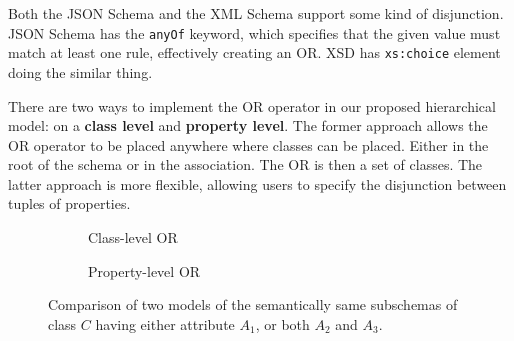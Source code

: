 Both the JSON Schema and the XML Schema support some kind of disjunction. JSON Schema has the {\tt anyOf} keyword, which specifies that the given value must match at least one rule, effectively creating an OR. XSD has {\tt xs:choice} element doing the similar thing.

There are two ways to implement the OR operator in our proposed hierarchical model: on a \textbf{class level} and \textbf{property level}. The former approach allows the OR operator to be placed anywhere where classes can be placed. Either in the root of the schema or in the association. The OR is then a set of classes. The latter approach is more flexible, allowing users to specify the disjunction between tuples of properties.

\begin{figure}[h!]\centering
  \begin{subfigure}[b]{.5\textwidth}
    \centering
    \caption{Class-level OR}
    \end{subfigure}%
    \begin{subfigure}[b]{.5\textwidth}
    \centering
    \caption{Property-level OR}
    \end{subfigure}%
  \caption{Comparison of two models of the semantically same subschemas of class $C$ having either attribute $A_1$, or both $A_2$ and $A_3$.}
\end{figure}

